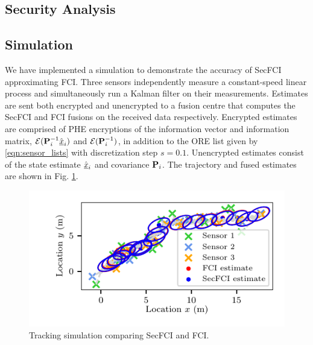 % 
% 

\subsection{Security Analysis}\label{subsec:cloud_fusion:secfci_security}

% 
% 

\subsection{Simulation} \label{sec:results}
We have implemented a simulation to demonstrate the accuracy of SecFCI approximating FCI. Three sensors independently measure a constant-speed linear process and simultaneously run a Kalman filter on their measurements. Estimates are sent both encrypted and unencrypted to a fusion centre that computes the SecFCI and FCI fusions on the received data respectively. Encrypted estimates are comprised of PHE encryptions of the information vector and information matrix, $\mathcal{E}({{\mathbf{P}}}^{-1}_i\hat{{\underline{x}}}_i)$ and $\mathcal{E}({{\mathbf{P}}}^{-1}_i)$, in addition to the ORE list given by \eqref{eqn:sensor_lists} with discretization step $s=0.1$. Unencrypted estimates consist of the state estimate $\hat{{\underline{x}}}_i$ and covariance ${{\mathbf{P}}}_i$. The trajectory and fused estimates are shown in Fig. \ref{fig:fci_secfci_traj}.
\begin{figure}[tb]
   \begin{center}
      \includegraphics{figures/fci_secfci_cmp.pdf}
   \end{center}
   \caption{Tracking simulation comparing SecFCI and FCI.}
   \label{fig:fci_secfci_traj}
\end{figure}

